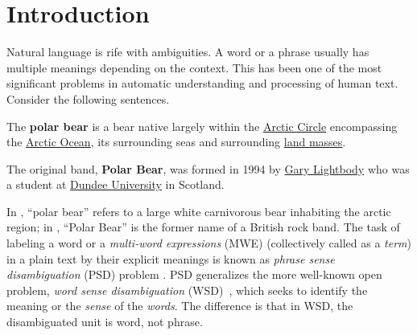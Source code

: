 \section{Introduction}
\label{intro}
Natural language is rife with ambiguities. A word or a phrase usually has
multiple meanings depending on the context.
This has been one of the most
significant problems in automatic understanding and processing of human
text.
Consider the following sentences.
\begin{example}
\label{ex-bear1}
The \textbf{polar bear} is a bear native largely within the \uline{Arctic Circle}
encompassing the \uline{Arctic Ocean}, its surrounding seas and surrounding \uline{land masses}.
\end{example}
\begin{example}
\label{ex-bear2}
The original band, \textbf{Polar Bear}, was formed in 1994 by
\uline{Gary Lightbody} who was a student at \uline{Dundee University} in Scotland.
\end{example}

In , ``polar bear'' refers to a large white carnivorous
bear inhabiting the arctic region; in , ``Polar Bear'' is
the former name of a British rock band. The task of labeling
a word or a {\em multi-word expressions} (MWE) (collectively called
as a {\em term}) in a plain text by their explicit meanings
is known as {\em phrase sense disambiguation}
(PSD) problem \cite{carpuat2007phrase}.
PSD generalizes the more well-known open problem,
{\em word sense disambiguation} (WSD)~\cite{navigli09:wsd}, which seeks
to identify the meaning or the {\em sense} of the {\em words}.
The difference is that in WSD, the disambiguated unit is word, not phrase.

